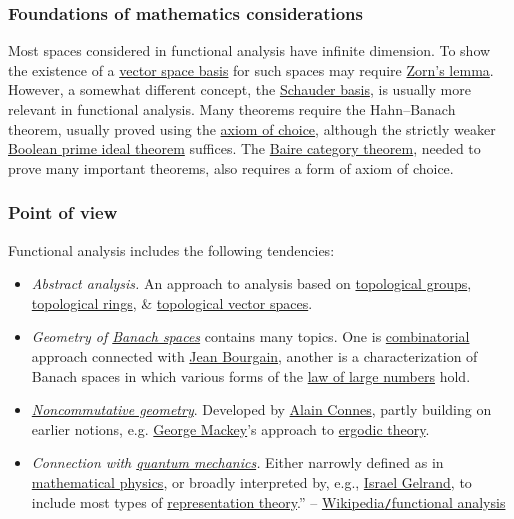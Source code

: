 \documentclass{article}
\begin{document}
\subsubsection{Foundations of mathematics considerations}
Most spaces considered in functional analysis have infinite dimension. To show the existence of a \href{https://en.wikipedia.org/wiki/Vector_space_basis}{vector space basis} for such spaces may require \href{https://en.wikipedia.org/wiki/Zorn%27s_lemma}{Zorn's lemma}. However, a somewhat different concept, the \href{https://en.wikipedia.org/wiki/Schauder_basis}{Schauder basis}, is usually more relevant in functional analysis. Many theorems require the Hahn--Banach theorem, usually proved using the \href{https://en.wikipedia.org/wiki/Axiom_of_choice}{axiom of choice}, although the strictly weaker \href{https://en.wikipedia.org/wiki/Boolean_prime_ideal_theorem}{Boolean prime ideal theorem} suffices. The \href{https://en.wikipedia.org/wiki/Baire_category_theorem}{Baire category theorem}, needed to prove many important theorems, also requires a form of axiom of choice.

\subsubsection{Point of view}
Functional analysis includes the following tendencies:
\begin{itemize}
	\item {\it Abstract analysis.} An approach to analysis based on \href{https://en.wikipedia.org/wiki/Topological_group}{topological groups}, \href{https://en.wikipedia.org/wiki/Topological_ring}{topological rings}, \& \href{https://en.wikipedia.org/wiki/Topological_vector_space}{topological vector spaces}.
	\item {\it Geometry of \href{https://en.wikipedia.org/wiki/Banach_space}{Banach spaces}} contains many topics. One is \href{https://en.wikipedia.org/wiki/Combinatorial}{combinatorial} approach connected with \href{https://en.wikipedia.org/wiki/Jean_Bourgain}{\sc Jean Bourgain}, another is a characterization of Banach spaces in which various forms of the \href{https://en.wikipedia.org/wiki/Law_of_large_numbers}{law of large numbers} hold.
	\item \href{https://en.wikipedia.org/wiki/Noncommutative_geometry}{\it Noncommutative geometry}. Developed by \href{https://en.wikipedia.org/wiki/Alain_Connes}{\sc Alain Connes}, partly building on earlier notions, e.g. \href{https://en.wikipedia.org/wiki/George_Mackey}{\sc George Mackey}'s approach to \href{https://en.wikipedia.org/wiki/Ergodic_theory}{ergodic theory}.
	\item {\it Connection with \href{https://en.wikipedia.org/wiki/Quantum_mechanics}{quantum mechanics}.} Either narrowly defined as in \href{https://en.wikipedia.org/wiki/Mathematical_physics}{mathematical physics}, or broadly interpreted by, e.g., \href{https://en.wikipedia.org/wiki/Israel_Gelfand}{\sc Israel Gelrand}, to include most types of \href{https://en.wikipedia.org/wiki/Representation_theory}{representation theory}.'' -- \href{https://en.wikipedia.org/wiki/Functional_analysis}{Wikipedia{\tt/}functional analysis}
\end{itemize}
\end{document}
